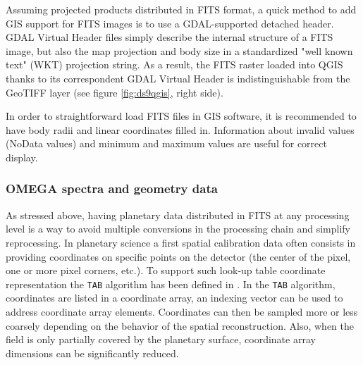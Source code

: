 Assuming projected products distributed in FITS format, a quick method to add GIS support for
FITS images is to use a GDAL-supported detached header.
GDAL Virtual Header files simply describe the internal structure of a FITS image, but
also the map projection and body size in a standardized "well known text"
(WKT) projection string.
As a result, the FITS raster loaded into QGIS thanks to its correspondent GDAL Virtual Header
is indistinguishable from the GeoTIFF layer (see figure \ref{fig:ds9qgis}, right side).

In order to straightforward load FITS files in GIS software, it is recommended to have
body radii and linear coordinates filled in.
Information about invalid values (NoData values) and minimum and maximum values are useful
for correct display.

\subsubsection{OMEGA spectra and geometry data}
As stressed above, having planetary data distributed in FITS at any processing level is
a way to avoid multiple conversions in the processing chain and simplify reprocessing.
In planetary science a first spatial calibration data often consists in providing coordinates
on specific points on the detector (the center of the pixel, one or more pixel corners, etc.).
To support such look-up table coordinate representation the \texttt{TAB} algorithm
has been defined in \citet{wcsspectral}.
In the \texttt{TAB} algorithm, coordinates are listed in a coordinate array, an indexing vector
can be used to address coordinate array elements.
Coordinates can then be sampled more or less coarsely depending on the behavior of the spatial
reconstruction.
Also, when the field is only partially covered by the planetary surface, coordinate array
dimensions can be significantly reduced. 


